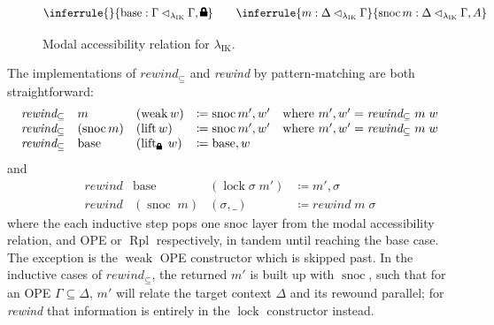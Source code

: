 \documentclass[12pt,twoside,openright]{report}
\numberwithin{equation}{chapter}
\numberwithin{figure}{chapter}
\numberwithin{table}{chapter}
\theoremstyle{definition}\newtheorem{definition}{Definition}
\newcommand{\lock}{\text{\tikz[baseline]{
      \fill[rounded corners=.1ex] (-.75ex,0) rectangle (.75ex,1ex);
      \draw[line width=.3ex] (-.4ex,.5ex) -- ++(0,.75ex) arc (180:0:.4ex) -- ++(0,-.75ex);
}}}
\begin{document}
\begin{figure}
  \centering
  \begin{equation*}
    \inferrule{}{\operatorname{base} : \Gamma \lhd_{\lambda_\text{IK}} \Gamma, \lock} \qquad
    \inferrule{m : \Delta \lhd_{\lambda_\text{IK}} \Gamma}{\operatorname{snoc} m : \Delta \lhd_{\lambda_\text{IK}} \Gamma, A}
  \end{equation*}
  \caption{Modal accessibility relation for $\lambda_\text{IK}$. \label{fig:ik-m}}
\end{figure}

The implementations of $\textit{rewind}_\subseteq$ and \textit{rewind}
by pattern-matching are both straightforward:
\begin{equation*}
  \begin{array}{llll}
    \textit{rewind}_\subseteq &m &(\operatorname{weak} w) &\coloneqq \operatorname{snoc} m' , w' \quad \text{where } m' , w' = \textit{rewind}_\subseteq \; m \; w \\
    \textit{rewind}_\subseteq &(\operatorname{snoc} m) &(\operatorname{lift} w) &\coloneqq \operatorname{snoc} m' , w' \quad \text{where } m' , w' = \textit{rewind}_\subseteq \; m \; w \\
    \textit{rewind}_\subseteq &\operatorname{base} &(\operatorname{lift}_\lock \; w) &\coloneqq \operatorname{base} , w
  \end{array}
\end{equation*}
and
\begin{equation}\label{eq:ik-rewind}
  \begin{array}{llll}
    \textit{rewind} &\operatorname{base} &(\operatorname{lock} \sigma \; m') &\coloneqq m' , \sigma \\
    \textit{rewind} &(\operatorname{snoc} \; m) &(\sigma , \_) &\coloneqq \textit{rewind} \; m \; \sigma
  \end{array}
\end{equation}
where the each inductive step pops one snoc layer from
the modal accessibility relation, and OPE or $\operatorname{Rpl}$ respectively,
in tandem until reaching the base case.
The exception is the $\operatorname{weak}$ OPE constructor which is skipped past.
In the inductive cases of $\textit{rewind}_\subseteq$,
the returned $m'$ is built up with $\operatorname{snoc}$,
such that for an OPE $\Gamma \subseteq \Delta$,
$m'$ will relate the target context $\Delta$ and its rewound parallel;
for \textit{rewind} that information is entirely in the $\operatorname{lock}$ constructor instead.
\end{document}
